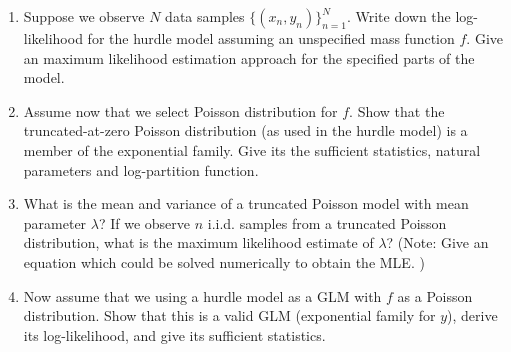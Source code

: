 \begin{problem}
\begin{enumerate}[label=(\alph*)]
\item Suppose we observe $N$ data samples $\{(x_n, y_n)\}_{n=1}^N$.  Write down the log-likelihood for the hurdle model assuming an unspecified mass function $f$.
Give an maximum likelihood estimation approach for the specified parts of the model.

\item Assume now that we select Poisson distribution for $f$. Show
  that the truncated-at-zero Poisson distribution (as used in the
  hurdle model) is a member of the exponential family.  Give its the
  sufficient statistics, natural parameters and log-partition
  function.

\item What is the mean and variance of a truncated Poisson model with mean parameter $\lambda$? If we observe $n$ i.i.d. samples from a truncated Poisson distribution, what is the maximum likelihood estimate of $\lambda$? (Note: Give an equation which could be solved numerically to obtain the MLE. )

\item  Now assume that we using a hurdle model as a GLM with $f$ as a Poisson distribution. Show that
  this is a valid GLM (exponential family for $y$), derive its log-likelihood, and give its sufficient statistics.

\end{enumerate}
\end{problem}

